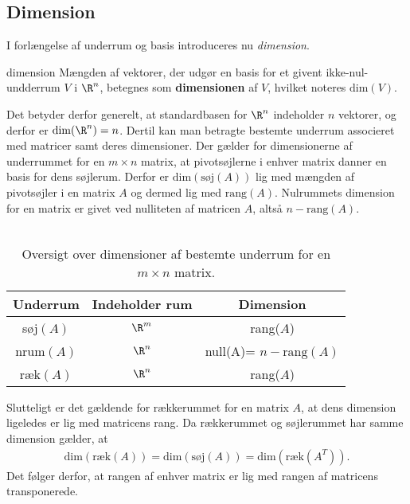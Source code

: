 \subsection{Dimension}
I forlængelse af underrum og basis introduceres nu
\textit{dimension}. 
%
\begin{defn}{}{dimension}
Mængden af vektorer, der udgør en basis for et givent ikke-nul-undderrum $V$ i $\R^n$, betegnes som \textbf{dimensionen} af $V$, hvilket noteres $\text{dim}(V)$. 
\end{defn}
\noindent
Det betyder derfor generelt, at standardbasen for $\R^n$ indeholder $n$ vektorer, og derfor er $\text{dim}(\R^n) = n$. 
Dertil kan man betragte bestemte underrum associeret med matricer samt deres dimensioner. 
Der gælder for dimensionerne af underrummet for en $m \times n$ matrix, at pivotsøjlerne i enhver matrix danner en basis for dens søjlerum. 
Derfor er $\text{dim}(\text{søj}(A))$ lig med mængden af pivotsøjler i en matrix $A$ og dermed lig med $\text{rang}(A)$. 
Nulrummets dimension for en matrix er givet ved nulliteten af matricen $A$, altså $n-\text{rang}(A)$. 
\\\\
%
\begin{table}[h!]
\begin{center}
 \begin{tabular}{||c c c||} 
 \hline
 Underrum & Indeholder rum & Dimension\\
 \hline\hline
 søj$(A)$ & $\R^m$ & rang($A$)\\ 
 \hline
 nrum$(A)$ & $\R^n$ & null(A)= $n-\text{rang}(A)$\\
 \hline
 ræk$(A)$ & $\R^n$ & rang($A$)\\
 \hline
\end{tabular}
\caption{Oversigt over dimensioner af bestemte underrum for en $m \times n$ matrix.}
\end{center}
\end{table}
%


%
\noindent
Slutteligt er det gældende for rækkerummet for en matrix $A$, at dens dimension ligeledes er lig med matricens rang. 
Da rækkerummet og søjlerummet har samme dimension gælder, at
%
\begin{align*}
\text{dim}(\text{ræk}(A))=\text{dim}(\text{søj}(A))=\text{dim}(\text{ræk}(A^T)).
\end{align*}
%
Det følger derfor, at rangen af enhver matrix er lig med rangen af matricens transponerede. 
%